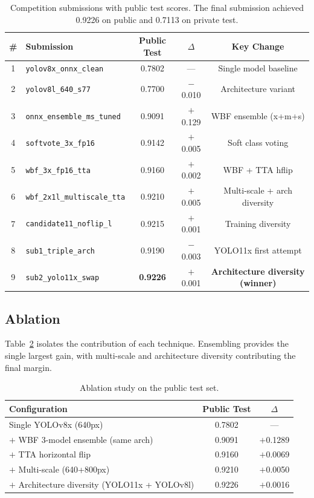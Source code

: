 \documentclass[11pt,a4paper]{article}
\begin{document}
\begin{table}[H]
\centering
\caption{Competition submissions with public test scores. The final submission achieved 0.9226 on public and 0.7113 on private test.}
\label{tab:submissions}
\small
\begin{tabular}{@{}clccc@{}}
\toprule
\textbf{\#} & \textbf{Submission} & \textbf{Public Test} & \textbf{$\Delta$} & \textbf{Key Change} \\
\midrule
1 & \texttt{yolov8x\_onnx\_clean}       & 0.7802 & ---     & Single model baseline \\
2 & \texttt{yolov8l\_640\_s77}           & 0.7700 & $-$0.010 & Architecture variant \\
3 & \texttt{onnx\_ensemble\_ms\_tuned}   & 0.9091 & $+$0.129 & WBF ensemble (x+m+s) \\
4 & \texttt{softvote\_3x\_fp16}          & 0.9142 & $+$0.005 & Soft class voting \\
5 & \texttt{wbf\_3x\_fp16\_tta}          & 0.9160 & $+$0.002 & WBF + TTA hflip \\
6 & \texttt{wbf\_2x1l\_multiscale\_tta}  & 0.9210 & $+$0.005 & Multi-scale + arch diversity \\
7 & \texttt{candidate11\_noflip\_l}      & 0.9215 & $+$0.001 & Training diversity \\
8 & \texttt{sub1\_triple\_arch}          & 0.9190 & $-$0.003 & YOLO11x first attempt \\
\rowcolor{okgreen!15}
9 & \texttt{sub2\_yolo11x\_swap}         & \textbf{0.9226} & $+$0.001 & \textbf{Architecture diversity (winner)} \\
\bottomrule
\end{tabular}
\end{table}

\subsection{Ablation}

Table~\ref{tab:ablation} isolates the contribution of each technique.
Ensembling provides the single largest gain, with multi-scale and architecture diversity contributing the final margin.

\begin{table}[H]
\centering
\caption{Ablation study on the public test set.}
\label{tab:ablation}
\begin{tabular}{@{}lcc@{}}
\toprule
\textbf{Configuration} & \textbf{Public Test} & \textbf{$\Delta$} \\
\midrule
Single YOLOv8x (640px)                            & 0.7802 & --- \\
$+$ WBF 3-model ensemble (same arch)              & 0.9091 & $+$0.1289 \\
$+$ TTA horizontal flip                           & 0.9160 & $+$0.0069 \\
$+$ Multi-scale (640+800px)                        & 0.9210 & $+$0.0050 \\
$+$ Architecture diversity (YOLO11x + YOLOv8l)    & 0.9226 & $+$0.0016 \\
\bottomrule
\end{tabular}
\end{table}
\end{document}
